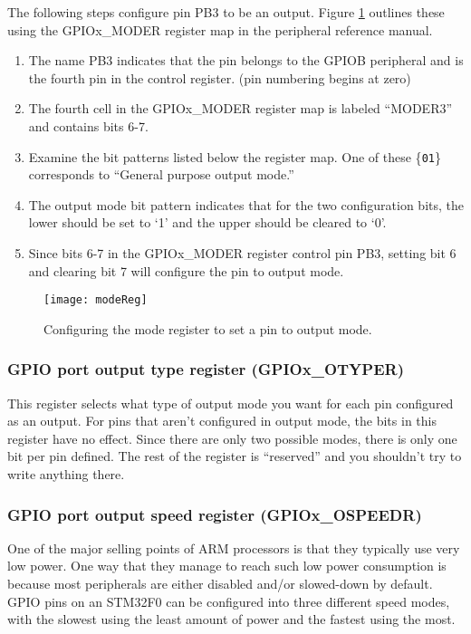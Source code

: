 \documentclass[11pt,fleqn]{book} %
\begin{document}
\begin{example}
    The following steps configure pin PB3 to be an output. Figure \ref{modeReg} outlines these using the GPIOx\_MODER register map in the peripheral reference manual.
    \begin{enumerate}
        \item The name PB3 indicates that the pin belongs to the GPIOB peripheral and is the fourth pin in the control register. (pin numbering begins at zero)
        \item The fourth cell in the GPIOx\_MODER register map is labeled ``MODER3'' and contains bits 6-7.
        \item Examine the bit patterns listed below the register map. One of these \{\texttt{01}\} corresponds to ``General purpose output mode.''
        \item The output mode bit pattern indicates that for the two configuration bits, the lower should be set to `1' and the upper should be cleared to `0'.
        \item Since bits 6-7 in the GPIOx\_MODER register control pin PB3, setting bit 6 and clearing bit 7 will configure the pin to output mode. 
    \end{enumerate}  
\end{example}

\begin{figure}[]
    \centering\texttt{[image: modeReg]}
    \caption{Configuring the mode register to set a pin to output mode.}
    \label{modeReg}
\end{figure}

\subsubsection{GPIO port output type register (GPIOx\_OTYPER)}
This register selects what type of output mode you want for each pin configured as an output. For pins that aren't configured in output mode, the bits in this register have no effect. Since there are only two possible modes, there is only one bit per pin defined. The rest of the register is ``reserved'' and you shouldn't try to write anything there.

\subsubsection{GPIO port output speed register (GPIOx\_OSPEEDR)}
One of the major selling points of ARM processors is that they typically use very low power. One way that they manage to reach such low power consumption is because most peripherals are either disabled and/or slowed-down by default. GPIO pins on an STM32F0 can be configured into three different speed modes, with the slowest using the least amount of power and the fastest using the most.
\end{document}
